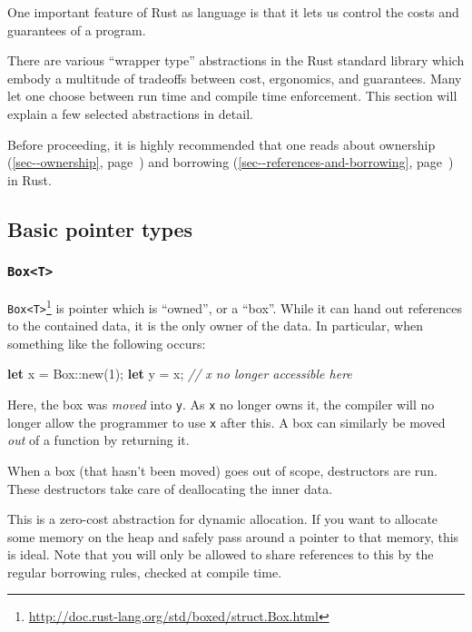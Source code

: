 \documentclass[a4paper,]{book}
\renewcommand*{\hyperref}[2][\ar]{%
  \def\ar{#2}%
  #2 (\autoref{#1}, page~\pageref{#1})}
\newenvironment{Shaded}{\begin{snugshade}}{\end{snugshade}}
\newcommand{\KeywordTok}[1]{\textcolor[rgb]{0.13,0.29,0.53}{\textbf{{#1}}}}
\newcommand{\DataTypeTok}[1]{\textcolor[rgb]{0.13,0.29,0.53}{{#1}}}
\newcommand{\DecValTok}[1]{\textcolor[rgb]{0.00,0.00,0.81}{{#1}}}
\newcommand{\CommentTok}[1]{\textcolor[rgb]{0.56,0.35,0.01}{\textit{{#1}}}}
\newcommand{\NormalTok}[1]{{#1}}
\renewcommand{\href}[2]{#2\footnote{\url{#1}}}
\begin{document}
One important feature of Rust as language is that it lets us control the
costs and guarantees of a program.

There are various ``wrapper type'' abstractions in the Rust standard
library which embody a multitude of tradeoffs between cost, ergonomics,
and guarantees. Many let one choose between run time and compile time
enforcement. This section will explain a few selected abstractions in
detail.

Before proceeding, it is highly recommended that one reads about
\hyperref[sec--ownership]{ownership} and
\hyperref[sec--references-and-borrowing]{borrowing} in Rust.

\subsection{Basic pointer types}\label{basic-pointer-types}

\subsubsection{\texorpdfstring{\texttt{Box\textless{}T\textgreater{}}}{Box\textless{}T\textgreater{}}}\label{boxt}

\href{http://doc.rust-lang.org/std/boxed/struct.Box.html}{\texttt{Box\textless{}T\textgreater{}}}
is pointer which is ``owned'', or a ``box''. While it can hand out
references to the contained data, it is the only owner of the data. In
particular, when something like the following occurs:

\begin{Shaded}
\begin{Highlighting}[]
\KeywordTok{let} \NormalTok{x = }\DataTypeTok{Box}\NormalTok{::new(}\DecValTok{1}\NormalTok{);}
\KeywordTok{let} \NormalTok{y = x;}
\CommentTok{// x no longer accessible here}
\end{Highlighting}
\end{Shaded}

Here, the box was \emph{moved} into \texttt{y}. As \texttt{x} no longer
owns it, the compiler will no longer allow the programmer to use
\texttt{x} after this. A box can similarly be moved \emph{out} of a
function by returning it.

When a box (that hasn't been moved) goes out of scope, destructors are
run. These destructors take care of deallocating the inner data.

This is a zero-cost abstraction for dynamic allocation. If you want to
allocate some memory on the heap and safely pass around a pointer to
that memory, this is ideal. Note that you will only be allowed to share
references to this by the regular borrowing rules, checked at compile
time.
\end{document}
